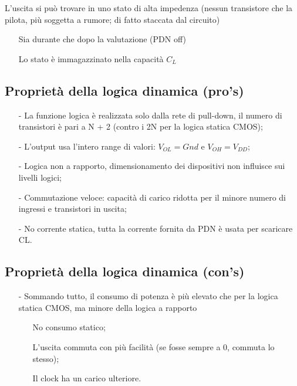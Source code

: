 L'uscita si può trovare in	uno stato di	alta impedenza
(nessun transistore che la	pilota, più soggetta a rumore;	di	fatto staccata dal circuito)
\begin{itemize}
    \item[] Sia durante che dopo la	valutazione (PDN	off)
    \item[] Lo	stato è	immagazzinato nella capacità $C_L$
\end{itemize}

\subsection{Proprietà della logica dinamica (pro's)}
\begin{itemize}
    \item[-] La	funzione logica è	realizzata solo	dalla rete	di	pull-down, il	numero di	transistori è	pari a	N	+	2	(contro i	2N	per la	logica statica CMOS);
    \item[-] L'output usa l'intero range	di	valori: $V_{OL} = Gnd$ e	$V_{OH} =	V_{DD}$;
    \item[-] Logica non	a	rapporto, dimensionamento dei dispositivi non	influisce sui	livelli logici;
    \item[-] Commutazione veloce: capacità di	carico ridotta per	il minore numero di	ingressi e	transistori in	uscita;
    \item[-] No	corrente statica, tutta la	corrente fornita da	PDN	è	usata per	scaricare CL.
\end{itemize}

\subsection{Proprietà della logica dinamica (con's)}

\begin{itemize}
    \item[-] Sommando tutto,	il consumo di	potenza è	più elevato che per	la	logica statica CMOS, ma minore della logica a rapporto
     \begin{itemize}
         \item[] No	consumo statico;
         \item[] L'uscita commuta con	più facilità (se	fosse	sempre a	0,	commuta lo	stesso);
         \item[] Il	clock	ha	un	carico ulteriore.
     \end{itemize}
\end{itemize}


